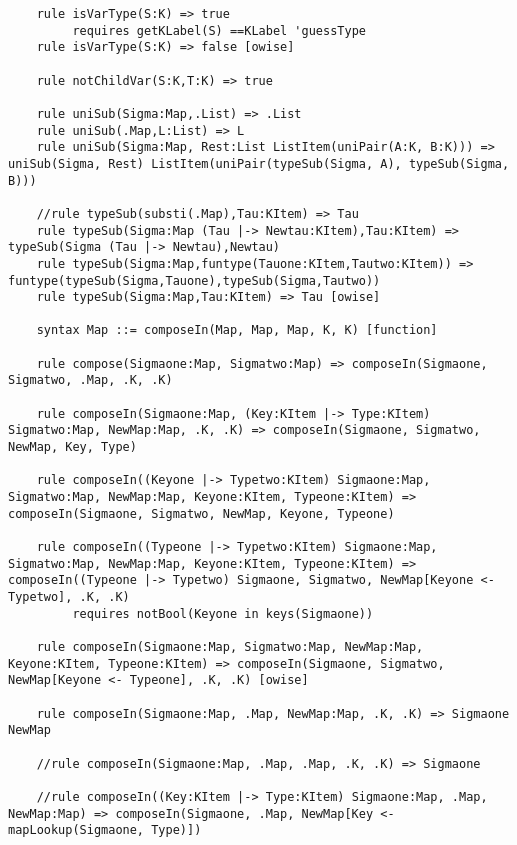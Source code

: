 \begin{lstlisting}
    rule isVarType(S:K) => true
         requires getKLabel(S) ==KLabel 'guessType
    rule isVarType(S:K) => false [owise]

    rule notChildVar(S:K,T:K) => true

    rule uniSub(Sigma:Map,.List) => .List
    rule uniSub(.Map,L:List) => L
    rule uniSub(Sigma:Map, Rest:List ListItem(uniPair(A:K, B:K))) => uniSub(Sigma, Rest) ListItem(uniPair(typeSub(Sigma, A), typeSub(Sigma, B)))

    //rule typeSub(substi(.Map),Tau:KItem) => Tau
    rule typeSub(Sigma:Map (Tau |-> Newtau:KItem),Tau:KItem) => typeSub(Sigma (Tau |-> Newtau),Newtau)
    rule typeSub(Sigma:Map,funtype(Tauone:KItem,Tautwo:KItem)) => funtype(typeSub(Sigma,Tauone),typeSub(Sigma,Tautwo))
    rule typeSub(Sigma:Map,Tau:KItem) => Tau [owise]

    syntax Map ::= composeIn(Map, Map, Map, K, K) [function]

    rule compose(Sigmaone:Map, Sigmatwo:Map) => composeIn(Sigmaone, Sigmatwo, .Map, .K, .K)

    rule composeIn(Sigmaone:Map, (Key:KItem |-> Type:KItem) Sigmatwo:Map, NewMap:Map, .K, .K) => composeIn(Sigmaone, Sigmatwo, NewMap, Key, Type)

    rule composeIn((Keyone |-> Typetwo:KItem) Sigmaone:Map, Sigmatwo:Map, NewMap:Map, Keyone:KItem, Typeone:KItem) => composeIn(Sigmaone, Sigmatwo, NewMap, Keyone, Typeone)

    rule composeIn((Typeone |-> Typetwo:KItem) Sigmaone:Map, Sigmatwo:Map, NewMap:Map, Keyone:KItem, Typeone:KItem) => composeIn((Typeone |-> Typetwo) Sigmaone, Sigmatwo, NewMap[Keyone <- Typetwo], .K, .K)
         requires notBool(Keyone in keys(Sigmaone))

    rule composeIn(Sigmaone:Map, Sigmatwo:Map, NewMap:Map, Keyone:KItem, Typeone:KItem) => composeIn(Sigmaone, Sigmatwo, NewMap[Keyone <- Typeone], .K, .K) [owise]

    rule composeIn(Sigmaone:Map, .Map, NewMap:Map, .K, .K) => Sigmaone NewMap

    //rule composeIn(Sigmaone:Map, .Map, .Map, .K, .K) => Sigmaone

    //rule composeIn((Key:KItem |-> Type:KItem) Sigmaone:Map, .Map, NewMap:Map) => composeIn(Sigmaone, .Map, NewMap[Key <- mapLookup(Sigmaone, Type)])


\end{lstlisting}
